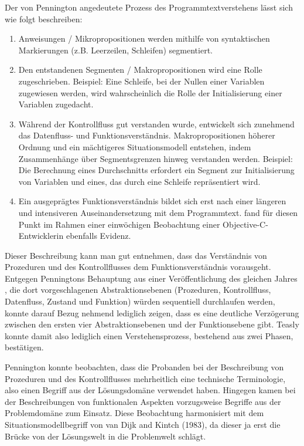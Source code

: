 Der von Pennington angedeutete Prozess des Programmtextverstehens lässt sich wie folgt beschreiben:
\begin{enumerate}
\item Anweisungen / Mikropropositionen werden mithilfe von syntaktischen Markierungen (z.B. Leerzeilen, Schleifen) segmentiert.
\item Den entstandenen Segmenten / Makropropositionen wird eine Rolle zugeschrieben. Beispiel: Eine Schleife, bei der Nullen einer Variablen zugewiesen werden, wird wahrscheinlich die Rolle der Initialisierung einer Variablen zugedacht.
\item Während der Kontrollfluss gut verstanden wurde, entwickelt sich zunehmend das Datenfluss- und Funktionsverständnis. Makropropositionen höherer Ordnung und ein mächtigeres Situationsmodell entstehen, indem Zusammenhänge über Segmentsgrenzen hinweg verstanden werden. Beispiel: Die Berechnung eines Durchschnitts erfordert ein Segment zur Initialisierung von Variablen und eines, das durch eine Schleife repräsentiert wird.
\item Ein ausgeprägtes Funktionsverständnis bildet sich erst nach einer längeren und intensiveren Auseinandersetzung mit dem Programmtext. \cite{Lange:1989jr} fand für diesen Punkt im Rahmen einer einwöchigen Beobachtung einer Objective-C-Entwicklerin ebenfalls Evidenz.
\end{enumerate}

Dieser Beschreibung kann man gut entnehmen, dass das Verständnis von Prozeduren und des Kontrollflusses dem Funktionsverständnis vorausgeht. Entgegen Penningtons Behauptung aus einer Veröffentlichung des gleichen Jahres \citep{Pennington:1987dc}, die dort vorgeschlagenen Abstraktionsebenen (Prozeduren, Kontrollfluss, Datenfluss, Zustand und Funktion) würden sequentiell durchlaufen werden, konnte \cite{Teasley:1994gr} darauf Bezug nehmend lediglich zeigen, dass es eine deutliche Verzögerung zwischen den ersten vier Abstraktionsebenen und der Funktionsebene gibt. Teasly konnte damit also lediglich einen Verstehensprozess, bestehend aus zwei Phasen, bestätigen.

Pennington konnte beobachten, dass die Probanden bei der Beschreibung von Prozeduren und des Kontrollflusses mehrheitlich eine technische Terminologie, also einen Begriff aus der Lösungsdomäne verwendet haben. Hingegen kamen bei der Beschreibungen von funktionalen Aspekten vorzugsweise Begriffe aus der Problemdomäne zum Einsatz. Diese Beobachtung harmonisiert mit dem Situationsmodellbegriff von van Dijk and Kintch (1983), da dieser ja erst die Brücke von der Lösungswelt in die Problemwelt schlägt.


